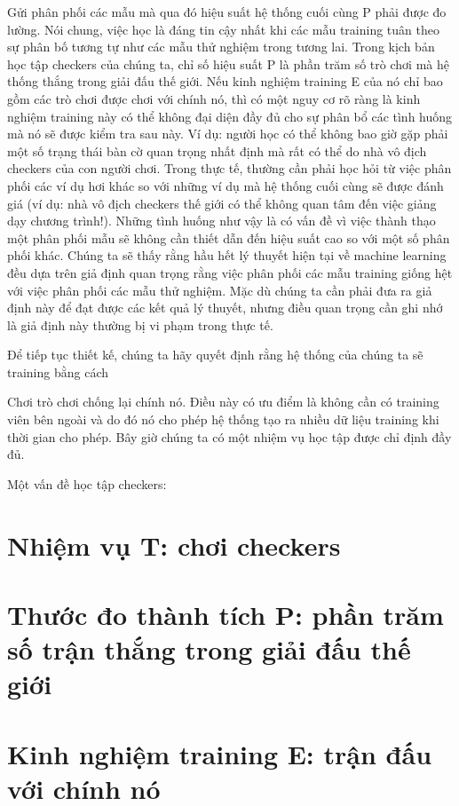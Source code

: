 Gửi phân phối các mẫu mà qua đó hiệu suất hệ thống cuối cùng P phải được đo lường. Nói chung, việc học là đáng tin cậy nhất khi các mẫu training tuân theo sự phân bố tương tự như các mẫu thử nghiệm trong tương lai. Trong kịch bản học tập checkers của chúng ta, chỉ số hiệu suất P là phần trăm số trò chơi mà hệ thống thắng trong giải đấu thế giới. Nếu kinh nghiệm training E của nó chỉ bao gồm các trò chơi được chơi với chính nó, thì có một nguy cơ rõ ràng là kinh nghiệm training này có thể không đại diện đầy đủ cho sự phân bổ các tình huống mà nó sẽ được kiểm tra sau này. Ví dụ: người học có thể không bao giờ gặp phải một số trạng thái bàn cờ quan trọng nhất định mà rất có thể do nhà vô địch checkers của con người chơi. Trong thực tế, thường cần phải học hỏi từ việc phân phối các ví dụ hơi khác so với những ví dụ mà hệ thống cuối cùng sẽ được đánh giá (ví dụ: nhà vô địch checkers thế giới có thể không quan tâm đến việc giảng dạy chương trình!). Những tình huống như vậy là có vấn đề vì việc thành thạo một phân phối mẫu sẽ không cần thiết dẫn đến hiệu suất cao so với một số phân phối khác. Chúng ta sẽ thấy rằng hầu hết lý thuyết hiện tại về machine learning đều dựa trên giả định quan trọng rằng việc phân phối các mẫu training giống hệt với việc phân phối các mẫu thử nghiệm. Mặc dù chúng ta cần phải đưa ra giả định này để đạt được các kết quả lý thuyết, nhưng điều quan trọng cần ghi nhớ là giả định này thường bị vi phạm trong thực tế.

Để tiếp tục thiết kế, chúng ta hãy quyết định rằng hệ thống của chúng ta sẽ training bằng cách

Chơi trò chơi chống lại chính nó. Điều này có ưu điểm là không cần có training viên bên ngoài và do đó nó cho phép hệ thống tạo ra nhiều dữ liệu training khi thời gian cho phép. Bây giờ chúng ta có một nhiệm vụ học tập được chỉ định đầy đủ.

Một vấn đề học tập checkers:

\section{Nhiệm vụ T: chơi checkers}

\section{Thước đo thành tích P: phần trăm số trận thắng trong giải đấu thế giới}

\section{Kinh nghiệm training E: trận đấu với chính nó}

